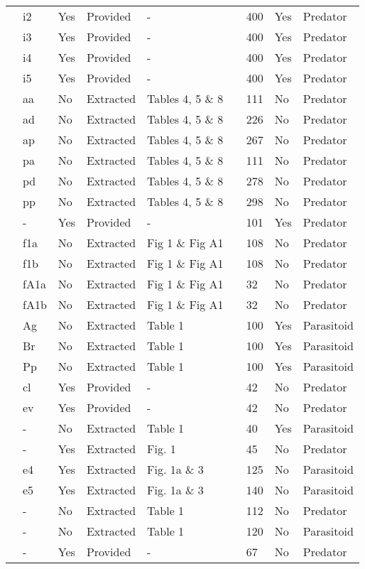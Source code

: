 \begin{longtable}{lllllllll}
\citet{Elliott:2005aa}&i2&Yes&Provided&-&&400&Yes&Predator\tabularnewline
\citet{Elliott:2005aa}&i3&Yes&Provided&-&&400&Yes&Predator\tabularnewline
\citet{Elliott:2005aa}&i4&Yes&Provided&-&&400&Yes&Predator\tabularnewline
\citet{Elliott:2005aa}&i5&Yes&Provided&-&&400&Yes&Predator\tabularnewline
\citet{Eveleigh:1982aa}&aa&No&Extracted&Tables 4, 5 \& 8&\citet{Novak:2020aa}&111&No&Predator\tabularnewline
\citet{Eveleigh:1982aa}&ad&No&Extracted&Tables 4, 5 \& 8&\citet{Novak:2020aa}&226&No&Predator\tabularnewline
\citet{Eveleigh:1982aa}&ap&No&Extracted&Tables 4, 5 \& 8&\citet{Novak:2020aa}&267&No&Predator\tabularnewline
\citet{Eveleigh:1982aa}&pa&No&Extracted&Tables 4, 5 \& 8&\citet{Novak:2020aa}&111&No&Predator\tabularnewline
\citet{Eveleigh:1982aa}&pd&No&Extracted&Tables 4, 5 \& 8&\citet{Novak:2020aa}&278&No&Predator\tabularnewline
\citet{Eveleigh:1982aa}&pp&No&Extracted&Tables 4, 5 \& 8&\citet{Novak:2020aa}&298&No&Predator\tabularnewline
\citet{Fussmann:2005aa}&-&Yes&Provided&-&\citet{Fussmann:2020aa}&101&Yes&Predator\tabularnewline
\citet{Griffen:2007aa}&f1a&No&Extracted&Fig 1 \& Fig A1&\citet{Novak:2020aa}&108&No&Predator\tabularnewline
\citet{Griffen:2007aa}&f1b&No&Extracted&Fig 1 \& Fig A1&\citet{Novak:2020aa}&108&No&Predator\tabularnewline
\citet{Griffen:2007aa}&fA1a&No&Extracted&Fig 1 \& Fig A1&\citet{Novak:2020aa}&32&No&Predator\tabularnewline
\citet{Griffen:2007aa}&fA1b&No&Extracted&Fig 1 \& Fig A1&\citet{Novak:2020aa}&32&No&Predator\tabularnewline
\citet{Hassan:1976aa}&Ag&No&Extracted&Table 1&\citet{Novak:2020aa}&100&Yes&Parasitoid\tabularnewline
\citet{Hassan:1976aa}&Br&No&Extracted&Table 1&\citet{Novak:2020aa}&100&Yes&Parasitoid\tabularnewline
\citet{Hassan:1976aa}&Pp&No&Extracted&Table 1&\citet{Novak:2020aa}&100&Yes&Parasitoid\tabularnewline
\citet{Hossie:2016aa}&cl&Yes&Provided&-&\citet{Hossie:2020aa}&42&No&Predator\tabularnewline
\citet{Hossie:2016aa}&ev&Yes&Provided&-&\citet{Hossie:2020aa}&42&No&Predator\tabularnewline
\citet{Huffaker:1982aa}&-&No&Extracted&Table 1&\citet{Novak:2020aa}&40&Yes&Parasitoid\tabularnewline
\citet{Johnson:2006aa}&-&Yes&Extracted&Fig. 1&\citet{Novak:2020aa}&45&No&Predator\tabularnewline
\citet{Jones:1988aa, Jones:1986aa}&e4&Yes&Extracted&Fig. 1a \& 3&\citet{Novak:2020aa}&125&No&Parasitoid\tabularnewline
\citet{Jones:1988aa, Jones:1986aa}&e5&Yes&Extracted&Fig. 1a \& 3&\citet{Novak:2020aa}&140&No&Parasitoid\tabularnewline
\citet{Katz:1985ai}&-&No&Extracted&Table 1&\citet{Arditi:1990sp}&112&No&Predator\tabularnewline
\citet{Kfir:1983aa}&-&No&Extracted&Table 1&\citet{Novak:2020aa}&120&No&Parasitoid\tabularnewline
\citet{Kratina:2009aa}&-&Yes&Provided&-&\citet{Kratina:2020aa}&67&No&Predator\tabularnewline

\end{longtable}
